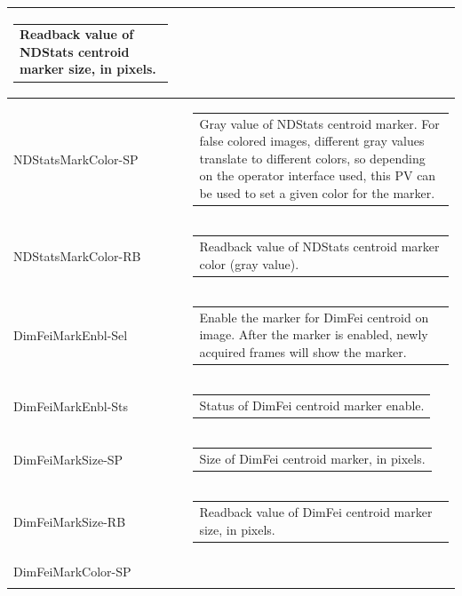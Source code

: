 \documentclass[openany]{article}
\begin{document}
\begin{longtable}{| m{3.0cm} m{4.5cm} m{7.0cm} |}
\begin{tabular}{@{}m{6cm}@{}}
                Readback value of NDStats centroid marker size, in pixels.
            \end{tabular} \hypertarget{pv:ndstats-mark-color}{}\\ \hline
        NDStatsMarkColor-SP &  & \begin{tabular}{@{}m{6cm}@{}}
                Gray value of NDStats centroid marker. For false colored images,
                different gray values translate to different colors, so depending
                on the operator interface used, this PV can be used to set a given
                color for the marker.
            \end{tabular} \hypertarget{}{}\\ \hline
        NDStatsMarkColor-RB &  & \begin{tabular}{@{}m{6cm}@{}}
                Readback value of NDStats centroid marker color (gray value).
            \end{tabular} \hypertarget{pv:dimfei-mark-enbl}{}\\ \hline
        DimFeiMarkEnbl-Sel &  & \begin{tabular}{@{}m{6cm}@{}}
                Enable the marker for DimFei centroid on image. After the marker
                is enabled, newly acquired frames will show the marker.
            \end{tabular} \hypertarget{}{}\\ \hline
        DimFeiMarkEnbl-Sts &  & \begin{tabular}{@{}m{6cm}@{}}
                Status of DimFei centroid marker enable.
            \end{tabular} \hypertarget{pv:dimfei-mark-size}{}\\ \hline
        DimFeiMarkSize-SP &  & \begin{tabular}{@{}m{6cm}@{}}
                Size of DimFei centroid marker, in pixels.
            \end{tabular} \hypertarget{}{}\\ \hline
        DimFeiMarkSize-RB &  & \begin{tabular}{@{}m{6cm}@{}}
                Readback value of DimFei centroid marker size, in pixels.
            \end{tabular} \hypertarget{pv:dimfei-mark-color}{}\\ \hline
        DimFeiMarkColor-SP &  & \begin{tabular}{@{}m{6cm}@{}}

\end{tabular}
\end{longtable}
\end{document}
